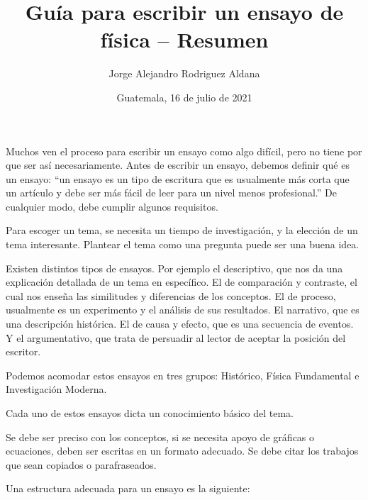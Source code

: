 \documentclass[11pt]{article}
\title{Guía para escribir un ensayo de física \--- Resumen}
\author{Jorge Alejandro Rodriguez Aldana}
\date{Guatemala, 16 de julio de 2021}
\begin{document}
\maketitle



Muchos ven el proceso para escribir un ensayo como algo difícil, pero no tiene por que ser así necesariamente. 
Antes de escribir un ensayo, debemos definir qué es un ensayo: ``un ensayo es un tipo de escritura que es usualmente más corta que un artículo y debe ser más fácil de leer para un nivel menos profesional.'' \cite{Guide}
De cualquier modo, debe cumplir algunos requisitos.

\medskip

Para escoger un tema, se necesita un tiempo de investigación, y la elección de un tema interesante. Plantear el tema como una pregunta puede ser una buena idea.

\medskip

Existen distintos tipos de ensayos. Por ejemplo el descriptivo, que nos da una explicación detallada de un tema en específico. El de comparación y contraste, el cual nos enseña las similitudes y diferencias de los conceptos. El de proceso, usualmente es un experimento y el análisis de sus resultados. El narrativo, que es una descripción histórica. El de causa y efecto, que es una secuencia de eventos. Y el argumentativo, que trata de persuadir al lector de aceptar la posición del escritor.

\medskip

Podemos acomodar estos ensayos en tres grupos: Histórico, Física Fundamental e Investigación Moderna. 

Cada uno de estos ensayos dicta un conocimiento básico del tema.

Se debe ser preciso con los conceptos, si se necesita apoyo de gráficas o ecuaciones, deben ser escritas en un formato adecuado. Se debe citar los trabajos que sean copiados o parafraseados.

\medskip

Una estructura adecuada para un ensayo es la siguiente:
\end{document}
